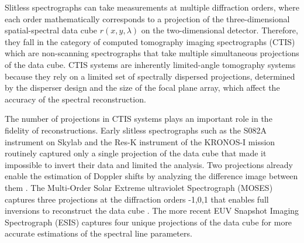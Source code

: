 \documentclass[linenumbers,twocolumn]{aastex7}
\begin{document}
Slitless spectrographs can take measurements at multiple diffraction orders, 
where each order mathematically corresponds to a projection of the
three-dimensional spatial-spectral data cube $r(x,y,\lambda)$ on the
two-dimensional detector.  Therefore, they fall in the category of computed
tomography imaging spectrographs (CTIS) \citep{okamoto1991simultaneous,
descour1995computed} which are non-scanning spectrographs that take
multiple simultaneous projections of the data cube. CTIS systems are inherently
limited-angle tomography systems because they rely on a limited set of
spectrally dispersed projections, determined by the disperser design and the
size of the focal plane array, which affect the accuracy of the spectral
reconstruction.

The number of projections in CTIS systems plays an important role in the
fidelity of reconstructions. Early slitless spectrographs such as the S082A
instrument on Skylab \citep{tousey1977extreme} and the Res-K instrument of the
KRONOS-I mission \citep{zhitnik1998spectral} routinely captured only a single
projection of the data cube that made it impossible to invert their data and
limited the analysis. Two projections already enable the estimation of Doppler
shifts by analyzing the difference image between them \citep{mariska1992solar,
courrier2018using}. The Multi-Order Solar Extreme ultraviolet Spectrograph
(MOSES) \citep{fox2011snapshot} captures three projections at the diffraction
orders -1,0,1 that enables full inversions to reconstruct the data cube
\citep{fox2003data}. The more recent EUV Snapshot Imaging Spectrograph (ESIS)
\citep{parker2022first} captures four unique projections of the data cube for
more accurate estimations of the spectral line parameters.

\end{document}
